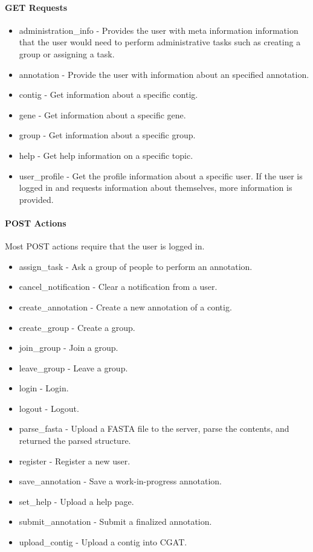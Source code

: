 \documentclass[10pt, conference, compsocconf]{IEEEtran}
\begin{document}
\paragraph{GET Requests}
\begin{itemize}
\item administration\_info - Provides the user with meta information information that the user would need to perform administrative tasks such as creating a group or assigning a task.
\item annotation - Provide the user with information about an specified annotation.
\item contig - Get information about a specific contig.
\item gene - Get information about a specific gene.
\item group - Get information about a specific group.
\item help - Get help information on a specific topic.
\item user\_profile - Get the profile information about a specific user. If the user is logged in and requests information about themselves, more information is provided.
\end{itemize}

\paragraph{POST Actions}
Most POST actions require that the user is logged in.

\begin{itemize}
\item assign\_task - Ask a group of people to perform an annotation.
\item cancel\_notification - Clear a notification from a user.
\item create\_annotation - Create a new annotation of a contig.
\item create\_group - Create a group.
\item join\_group - Join a group.
\item leave\_group - Leave a group.
\item login - Login.
\item logout - Logout.
\item parse\_fasta - Upload a FASTA file to the server, parse the contents, and returned the parsed structure.
\item register - Register a new user.
\item save\_annotation - Save a work-in-progress annotation.
\item set\_help - Upload a help page.
\item submit\_annotation - Submit a finalized annotation.
\item upload\_contig - Upload a contig into CGAT.
\end{itemize}
\end{document}

